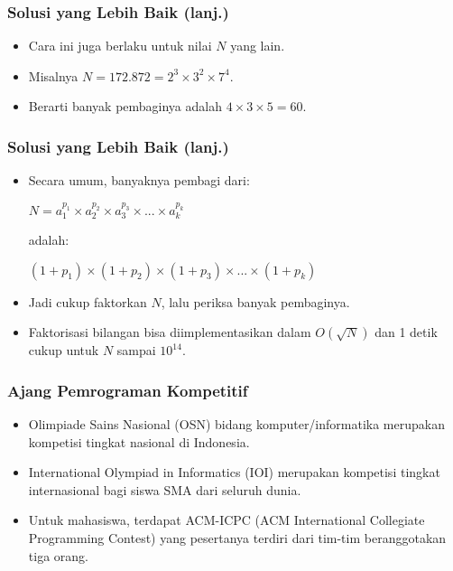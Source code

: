 \begin{frame}
\frametitle{Solusi yang Lebih Baik (lanj.)}
\begin{itemize}
  \item Cara ini juga berlaku untuk nilai $N$ yang lain.
  \item Misalnya $N = 172.872 = 2^3 \times 3^2 \times 7^4$.
  \item Berarti banyak pembaginya adalah $4 \times 3 \times 5 = 60$.
\end{itemize}
\end{frame}

\begin{frame}
\frametitle{Solusi yang Lebih Baik (lanj.)}
\begin{itemize}
  \item Secara umum, banyaknya pembagi dari:
  \newline
  \begin{center}
    $N = a_1^{p_1} \times a_2^{p_2} \times a_3^{p_3} \times ... \times a_k^{p_k}$
  \end{center}
  adalah:
  \newline
  \begin{center}
    $(1+p_1) \times (1+p_2) \times (1+p_3) \times ... \times (1+p_k)$
    \newline
  \end{center}
  \item Jadi cukup faktorkan $N$, lalu periksa banyak pembaginya.
  \item Faktorisasi bilangan bisa diimplementasikan dalam $O(\sqrt{N})$ dan 1 detik cukup untuk $N$ sampai $10^{14}$.
\end{itemize}
\end{frame}

\begin{frame}
\frametitle{Ajang Pemrograman Kompetitif}
\begin{itemize}
  \item Olimpiade Sains Nasional (OSN) bidang komputer/informatika merupakan kompetisi tingkat nasional di Indonesia.
  \item International Olympiad in Informatics (IOI) merupakan kompetisi tingkat internasional bagi siswa SMA dari seluruh dunia.
  \item Untuk mahasiswa, terdapat ACM-ICPC (ACM International Collegiate Programming Contest) yang pesertanya terdiri dari tim-tim beranggotakan tiga orang.
\end{itemize}
\end{frame}

